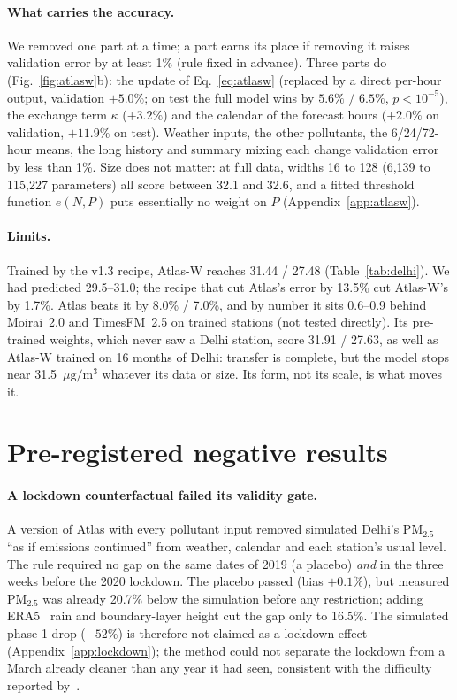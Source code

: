 \documentclass{article}
\newcommand{\pmu}{\ensuremath{\mu\mathrm{g/m^3}}}
\newcommand{\pmtf}{PM$_{2.5}$}
\begin{document}
\paragraph{What carries the accuracy.} We removed one part at a time; a part earns its place if removing it raises
validation error by at least 1\% (rule fixed in advance). Three parts do (Fig.~\ref{fig:atlasw}b): the update of
Eq.~\ref{eq:atlasw} (replaced by a direct per-hour output, validation $+5.0\%$; on test the full model wins by
$5.6\%$ / $6.5\%$, $p<10^{-5}$), the exchange term $\kappa$ ($+3.2\%$) and the calendar of the forecast hours
($+2.0\%$ on validation, $+11.9\%$ on test). Weather inputs, the other pollutants, the 6/24/72-hour means, the long
history and summary mixing each change validation error by less than 1\%. Size does not matter: at full data,
widths 16 to 128 (6,139 to 115,227 parameters) all score between 32.1 and 32.6, and a fitted threshold function
$e(N,P)$ puts essentially no weight on $P$ (Appendix~\ref{app:atlasw}).

\paragraph{Limits.} Trained by the v1.3 recipe, Atlas-W reaches 31.44 / 27.48 (Table~\ref{tab:delhi}). We had
predicted 29.5--31.0; the recipe that cut Atlas's error by 13.5\% cut Atlas-W's by 1.7\%. Atlas beats it by 8.0\% /
7.0\%, and by number it sits 0.6--0.9 behind Moirai~2.0 and TimesFM~2.5 on trained stations (not tested directly).
Its pre-trained weights, which never saw a Delhi station, score 31.91 / 27.63, as well as Atlas-W trained on 16 months
of Delhi: transfer is complete, but the model stops near 31.5~\pmu{} whatever its data or size. Its form, not its
scale, is what moves it.

\section{Pre-registered negative results}
\label{sec:negative}

\paragraph{A lockdown counterfactual failed its validity gate.} A version of Atlas with every pollutant input removed
simulated Delhi's \pmtf{} ``as if emissions continued'' from weather, calendar and each station's usual level. The
rule required no gap on the same dates of 2019 (a placebo) \emph{and} in the three weeks before the 2020 lockdown. The
placebo passed (bias $+0.1\%$), but measured \pmtf{} was already 20.7\% below the simulation before any restriction;
adding ERA5~\citep{hersbach2020era5} rain and boundary-layer height cut the gap only to 16.5\%. The simulated phase-1
drop ($-52\%$) is therefore not claimed as a lockdown effect (Appendix~\ref{app:lockdown}); the method could not
separate the lockdown from a March already cleaner than any year it had seen, consistent with the difficulty reported
by~\citep{shi2021lockdown}.
\end{document}
